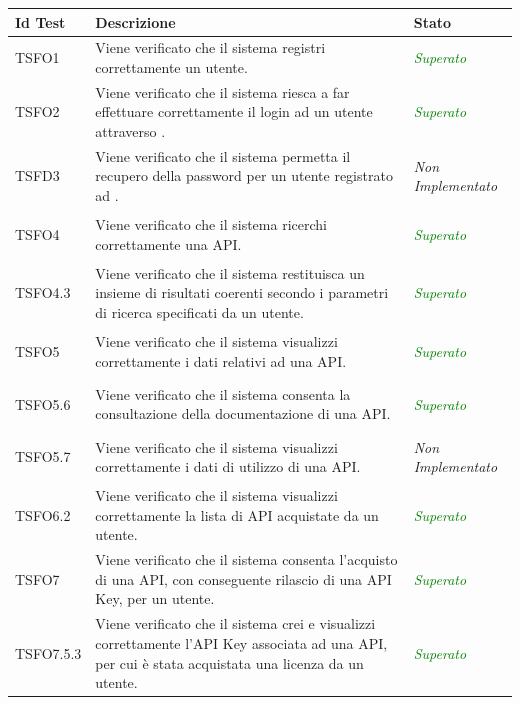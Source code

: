 	\normalsize
	\begin{longtable}{|>{\centering\arraybackslash}p{2.3cm}|>{\centering\arraybackslash}p{7.5cm} | >{\centering\arraybackslash}p{3.8cm}|}
		\hline \rowcolor{Gray}
		\textbf{Id Test} & \textbf{Descrizione} & \textbf{Stato}\\
		\hline
		\endhead
		\hypertarget{TSFO1}{TSFO1} & Viene verificato che il sistema registri correttamente un utente. & \textcolor{Green}{\textit{Superato}}\\ \hline
		\hypertarget{TSFO2}{TSFO2} & Viene verificato che il sistema riesca a far effettuare correttamente il login ad un utente attraverso \progetto. & \textcolor{Green}{\textit{Superato}}\\ \hline	
		\hypertarget{TSFD3}{TSFD3} & Viene verificato che il sistema permetta il recupero della password per un utente registrato ad \progetto. & \textit{Non Implementato}\\ \hline	
		\hypertarget{TSFO4}{TSFO4} & Viene verificato che il sistema ricerchi correttamente una API. & \textcolor{Green}{\textit{Superato}}\\ \hline
		\hypertarget{TSFO4.3}{TSFO4.3} & Viene verificato che il sistema restituisca un insieme di risultati coerenti secondo i parametri di ricerca specificati da un utente. & \textcolor{Green}{\textit{Superato}}\\ \hline	
		\hypertarget{TSFO5}{TSFO5} & Viene verificato che il sistema visualizzi correttamente i dati relativi ad una API. & \textcolor{Green}{\textit{Superato}}\\ \hline
		\hypertarget{TSFO5.6}{TSFO5.6} & Viene verificato che il sistema consenta la consultazione della documentazione di una API. & \textcolor{Green}{\textit{Superato}}\\ \hline
		\hypertarget{TSFO5.7}{TSFO5.7} & Viene verificato che il sistema visualizzi correttamente i dati di utilizzo di una API. & \textit{Non Implementato}\\ \hline
		\hypertarget{TSFO6.2}{TSFO6.2} & Viene verificato che il sistema visualizzi correttamente la lista di API acquistate da un utente. & \textcolor{Green}{\textit{Superato}}\\ \hline
		\hypertarget{TSFO7}{TSFO7} & Viene verificato che il sistema consenta l'acquisto di una API, con conseguente rilascio di una API Key, per un utente. & \textcolor{Green}{\textit{Superato}}\\ \hline
		\hypertarget{TSFO7.5.3}{TSFO7.5.3} & Viene verificato che il sistema crei e visualizzi correttamente l'API Key associata ad una API, per cui è stata acquistata una licenza da un utente. & \textcolor{Green}{\textit{Superato}}\\ \hline

\end{longtable}
